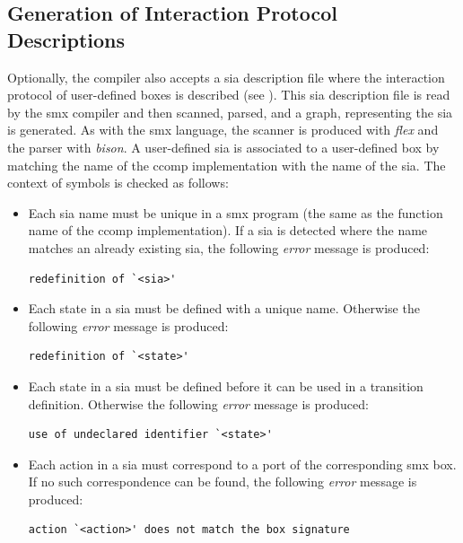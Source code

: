 \subsection{Generation of Interaction Protocol Descriptions}
\label{sect_tool_smxc_sia}
Optionally, the compiler also accepts a \gls{sia} description file where the interaction protocol of user-defined boxes is described (see \Sect{\ref{sect_smx_box_sia}}).
This \gls{sia} description file is read by the \gls*{smx} compiler and then scanned, parsed, and a graph, representing the \gls{sia} is generated.
As with the \gls*{smx} language, the scanner is produced with \emph{flex} and the parser with \emph{bison}.
A user-defined \gls{sia} is associated to a user-defined box by matching the name of the \gls*{ccomp} implementation with the name of the \gls{sia}.
The context of symbols is checked as follows:
\begin{itemize}
    \item Each \gls{sia} name must be unique in a \gls*{smx} program (the same as the function name of the \gls*{ccomp} implementation).
        If a \gls{sia} is detected where the name matches an already existing \gls{sia}, the following \emph{error} message is produced:
\begin{lstlisting}[style=msg]
redefinition of `<sia>'
\end{lstlisting}

    \item Each state in a \gls{sia} must be defined with a unique name.
        Otherwise the following \emph{error} message is produced:
\begin{lstlisting}[style=msg]
redefinition of `<state>'
\end{lstlisting}

    \item Each state in a \gls{sia} must be defined before it can be used in a transition definition.
        Otherwise the following \emph{error} message is produced:
\begin{lstlisting}[style=msg]
use of undeclared identifier `<state>'
\end{lstlisting}

    \item Each action in a \gls{sia} must correspond to a port of the corresponding \gls*{smx} box.
        If no such correspondence can be found, the following \emph{error} message is produced:
\begin{lstlisting}[style=msg]
action `<action>' does not match the box signature
\end{lstlisting}
\end{itemize}

